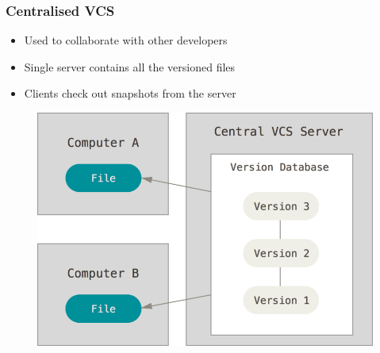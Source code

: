 \documentclass{beamer}
\begin{document}
\begin{frame}
	\frametitle{Centralised VCS}
	\begin{itemize}
		\item{Used to collaborate with other developers}
		\item{Single server contains all the versioned files}
		\item{Clients check out snapshots from the server}
	\end{itemize}
	\begin{figure}
		\includegraphics[scale=0.25]{Centralised_VCS-0.png}
	\end{figure}
\end{frame}
\end{document}
